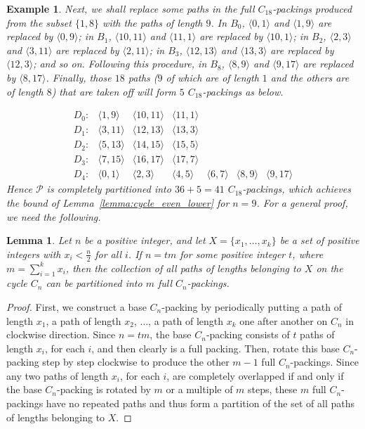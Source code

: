 \documentclass[journal,draftcls,onecolumn,12pt,twoside]{IEEEtran}
\newtheorem{lemma}[theorem]{\bf Lemma}
\newtheorem{example}{Example}
\begin{document}
\begin{example}
{Next, we shall replace some paths in the full $C_{18}$-packings produced from the subset $\{1,8\}$ with the paths of length $9$.
In $B_0$, $\langle 0,1\rangle$ and $\langle 1,9\rangle$ are replaced by $\langle 0,9\rangle$; in $B_1$, $\langle 10,11\rangle$ and $\langle 11,1\rangle$ are replaced by $\langle 10,1\rangle$; in $B_2$, $\langle 2,3\rangle$ and $\langle 3,11\rangle$ are replaced by $\langle 2,11\rangle$; in $B_3$, $\langle 12,13\rangle$ and $\langle 13,3\rangle$ are replaced by $\langle 12,3\rangle$; and so on.
Following this procedure, in $B_8$, $\langle 8,9\rangle$ and $\langle 9,17\rangle$ are replaced by $\langle 8,17\rangle$.
Finally, those $18$ paths ($9$ of which are of length $1$ and the others are of length $8$) that are taken off will form $5$ $C_{18}$-packings as below.

$$
\begin{array}{rcccccc}
D_0: & \langle 1,9\rangle & \langle 10,11\rangle & \langle 11,1\rangle \\
D_1: & \langle 3,11\rangle & \langle 12,13\rangle & \langle 13,3\rangle \\
D_2: & \langle 5,13\rangle & \langle 14,15\rangle & \langle 15,5\rangle \\
D_3: & \langle 7,15\rangle & \langle 16,17\rangle & \langle 17,7\rangle \\
D_4: & \langle 0,1\rangle & \langle 2,3\rangle & \langle 4,5\rangle & \langle 6,7 \rangle & \langle 8,9 \rangle & \langle 9,17 \rangle
\end{array}
$$
\noindent
Hence $\mathcal{P}$ is completely partitioned into $36+5=41$ $C_{18}$-packings, which achieves the bound of Lemma~\ref{lemma:cycle_even_lower} for $n=9$.
For a general proof, we need the following.
}
\end{example}

\begin{lemma}\label{lemma:partition}
Let $n$ be a positive integer, and let $X=\{x_1,\ldots,x_k\}$ be a set of positive integers with $x_i<\frac{n}{2}$ for all $i$.
If $n=tm$ for some positive integer $t$, where $m=\sum_{i=1}^k x_i$, then the collection of all paths of lengths belonging to $X$ on the cycle $C_n$ can be partitioned into $m$ full $C_n$-packings.
\end{lemma}
\begin{proof}
First, we construct a base $C_n$-packing by periodically putting a path of length $x_1$, a path of length $x_2$, $\ldots$, a path of length $x_k$ one after another on $C_n$ in clockwise direction.
Since $n=tm$, the base $C_n$-packing consists of $t$ paths of length $x_i$, for each $i$, and then clearly is a full packing.
Then, rotate this base $C_n$-packing step by step clockwise to produce the other $m-1$ full $C_n$-packings.
Since any two paths of length $x_i$, for each $i$, are completely overlapped if and only if the base $C_n$-packing is rotated by $m$ or a multiple of $m$ steps, these $m$ full $C_n$-packings have no repeated paths and thus form a partition of the set of all paths of lengths belonging to $X$.
\end{proof}
\end{document}
